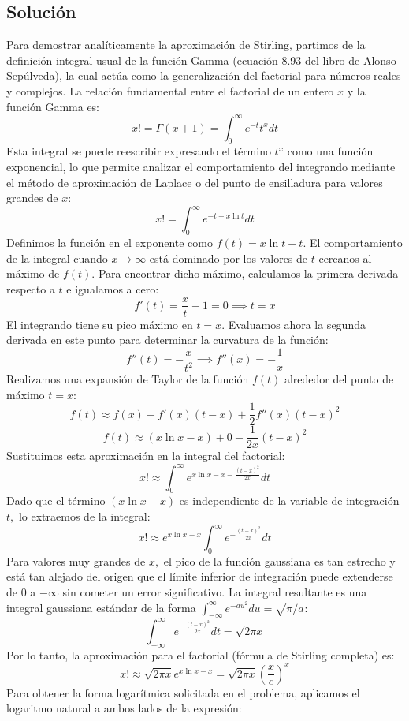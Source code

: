 \documentclass[a4paper]{article}
\begin{document}
\subsection{Solución}

Para demostrar analíticamente la aproximación de Stirling, partimos de la definición integral usual de la función Gamma (ecuación 8.93 del libro de Alonso Sepúlveda), la cual actúa como la generalización del factorial para números reales y complejos. La relación fundamental entre el factorial de un entero $x$ y la función Gamma es:
$$ x! = \Gamma(x+1) = \int_{0}^{\infty} e^{-t} t^x dt $$
Esta integral se puede reescribir expresando el término $t^x$ como una función exponencial, lo que permite analizar el comportamiento del integrando mediante el método de aproximación de Laplace o del punto de ensilladura para valores grandes de $x$:
$$ x! = \int_{0}^{\infty} e^{-t + x \ln t} dt $$
Definimos la función en el exponente como $f(t) = x \ln t - t.$ El comportamiento de la integral cuando $x \to \infty$ está dominado por los valores de $t$ cercanos al máximo de $f(t).$ Para encontrar dicho máximo, calculamos la primera derivada respecto a $t$ e igualamos a cero:
$$ f'(t) = \frac{x}{t} - 1 = 0 \implies t = x $$
El integrando tiene su pico máximo en $t = x.$ Evaluamos ahora la segunda derivada en este punto para determinar la curvatura de la función:
$$ f''(t) = -\frac{x}{t^2} \implies f''(x) = -\frac{1}{x} $$
Realizamos una expansión de Taylor de la función $f(t)$ alrededor del punto de máximo $t = x$:
$$ f(t) \approx f(x) + f'(x)(t-x) + \frac{1}{2}f''(x)(t-x)^2 $$
$$ f(t) \approx (x \ln x - x) + 0 - \frac{1}{2x}(t-x)^2 $$
Sustituimos esta aproximación en la integral del factorial:
$$ x! \approx \int_{0}^{\infty} e^{x \ln x - x - \frac{(t-x)^2}{2x}} dt $$
Dado que el término $(x \ln x - x)$ es independiente de la variable de integración $t,$ lo extraemos de la integral:
$$ x! \approx e^{x \ln x - x} \int_{0}^{\infty} e^{-\frac{(t-x)^2}{2x}} dt $$
Para valores muy grandes de $x,$ el pico de la función gaussiana es tan estrecho y está tan alejado del origen que el límite inferior de integración puede extenderse de $0$ a $-\infty$ sin cometer un error significativo. La integral resultante es una integral gaussiana estándar de la forma $\int_{-\infty}^{\infty} e^{-au^2} du = \sqrt{\pi/a}$:
$$ \int_{-\infty}^{\infty} e^{-\frac{(t-x)^2}{2x}} dt = \sqrt{2\pi x} $$
Por lo tanto, la aproximación para el factorial (fórmula de Stirling completa) es:
$$ x! \approx \sqrt{2\pi x} e^{x \ln x - x} = \sqrt{2\pi x} \left( \frac{x}{e} \right)^x $$
Para obtener la forma logarítmica solicitada en el problema, aplicamos el logaritmo natural a ambos lados de la expresión:
\end{document}

